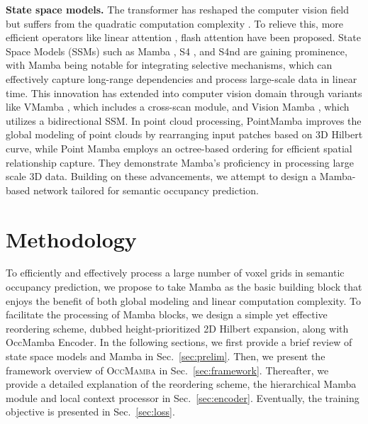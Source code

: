 \documentclass[10pt,twocolumn,letterpaper]{article}
\newcommand{\methodname}{\textsc{OccMamba}}
\begin{document}
\textbf{State space models.}
The transformer \cite{yiwei} has reshaped the computer vision field but suffers from the quadratic computation complexity \cite{davidhilbert2024}. To relieve this, more efficient operators like linear attention \cite{luisroldao2020}, flash attention \cite{xinli2022} have been proposed. State Space Models (SSMs) such as Mamba \cite{xiaokangchen2023}, S4 \cite{yinhaoli2020}, and S4nd \cite{wenwentong2024} are gaining prominence, with Mamba being notable for integrating selective mechanisms, which can effectively capture long-range dependencies and process large-scale data in linear time. This innovation has extended into computer vision domain through variants like VMamba \cite{yueliu2024}, which includes a cross-scan module, and Vision Mamba \cite{ref0}, which utilizes a bidirectional SSM. In point cloud processing, PointMamba \cite{jiumingliu2016} improves the global modeling of point clouds by rearranging input patches based on 3D Hilbert curve, while Point Mamba \cite{yuenanhou2024} employs an octree-based ordering for efficient spatial relationship capture. They demonstrate Mamba's proficiency in processing large scale 3D data. Building on these advancements, we attempt to design a Mamba-based network tailored for semantic occupancy prediction.


\section{Methodology}

To efficiently and effectively process a large number of voxel grids in semantic occupancy prediction, we propose to take Mamba \cite{xiaokangchen2023} as the basic building block that enjoys the benefit of both global modeling and linear computation complexity. To facilitate the processing of Mamba blocks, we design a simple yet effective reordering scheme, dubbed height-prioritized 2D Hilbert expansion, along with OccMamba Encoder. In the following sections, we first provide a brief review of state space models and Mamba in Sec.~\ref{sec:prelim}. Then, we present the framework overview of \methodname{} in Sec.~\ref{sec:framework}. Thereafter, we provide a detailed explanation of the reordering scheme, the hierarchical Mamba module and local context processor in Sec.~\ref{sec:encoder}. Eventually, the training objective is presented in Sec.~\ref{sec:loss}.
\end{document}
